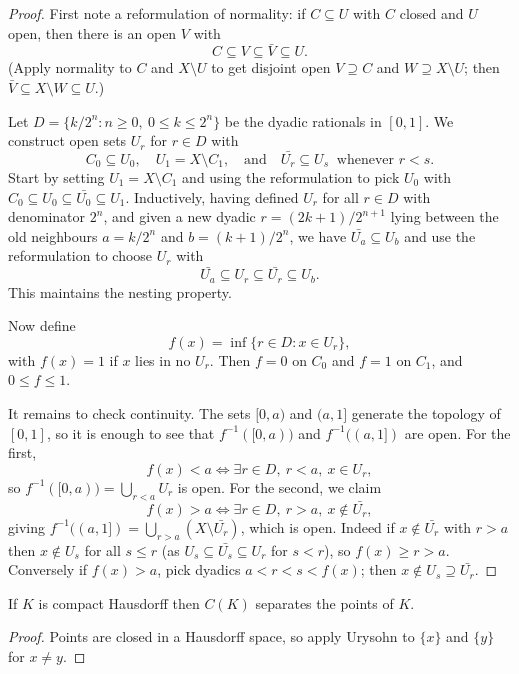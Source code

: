 \begin{proof}
	First note a reformulation of normality: if $C \subseteq U$ with $C$ closed and $U$ open, then there is an open $V$ with
	$$C \subseteq V \subseteq \bar V \subseteq U.$$
	(Apply normality to $C$ and $X \setminus U$ to get disjoint open $V \supseteq C$ and $W \supseteq X \setminus U$; then $\bar V \subseteq X \setminus W \subseteq U$.)

	Let $D = \{ k/2^n : n \geq 0, \ 0 \leq k \leq 2^n \}$ be the dyadic rationals in $[0,1]$. We construct open sets $U_r$ for $r \in D$ with
	$$C_0 \subseteq U_0, \quad U_1 = X \setminus C_1, \quad \text{and} \quad \bar{U_r} \subseteq U_s \ \text{ whenever } r < s.$$
	Start by setting $U_1 = X\setminus C_1$ and using the reformulation to pick $U_0$ with $C_0 \subseteq U_0 \subseteq \bar{U_0}\subseteq U_1$. Inductively, having defined $U_r$ for all $r \in D$ with denominator $2^n$, and given a new dyadic $r = (2k+1)/2^{n+1}$ lying between the old neighbours $a = k/2^n$ and $b = (k+1)/2^n$, we have $\bar{U_a} \subseteq U_b$ and use the reformulation to choose $U_r$ with
	$$\bar{U_a} \subseteq U_r \subseteq \bar{U_r} \subseteq U_b.$$
	This maintains the nesting property.

	Now define
	$$f(x) = \inf \{ r \in D : x \in U_r \},$$
	with $f(x) = 1$ if $x$ lies in no $U_r$. Then $f = 0$ on $C_0$ and $f = 1$ on $C_1$, and $0 \leq f \leq 1$.

	It remains to check continuity. The sets $[0,a)$ and $(a,1]$ generate the topology of $[0,1]$, so it is enough to see that $f^{-1}([0,a))$ and $f^{-1}((a,1])$ are open. For the first,
	$$f(x) < a \iff \exists r \in D, \ r < a, \ x \in U_r,$$
	so $f^{-1}([0,a)) = \bigcup_{r<a}U_r$ is open. For the second, we claim
	$$f(x) > a \iff \exists r \in D, \ r > a, \ x \notin \bar{U_r},$$
	giving $f^{-1}((a,1]) = \bigcup_{r > a}(X \setminus \bar{U_r})$, which is open. Indeed if $x \notin \bar{U_r}$ with $r > a$ then $x \notin U_s$ for all $s \leq r$ (as $U_s \subseteq \bar{U_s} \subseteq U_r$ for $s < r$), so $f(x) \geq r > a$. Conversely if $f(x) > a$, pick dyadics $a < r < s < f(x)$; then $x \notin U_s \supseteq \bar{U_r}$.
\end{proof}

\begin{corollary}
	If $K$ is compact Hausdorff then $C(K)$ separates the points of $K$.
\end{corollary}

\begin{proof}
	Points are closed in a Hausdorff space, so apply Urysohn to $\{x\}$ and $\{y\}$ for $x \neq y$.
\end{proof}


